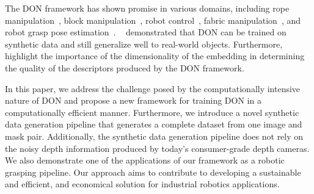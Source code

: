 The DON framework has shown promise in various domains, including rope manipulation~\cite{rope-manipulation},
block manipulation~\cite{block-manipulation}, robot control~\cite{florence2019self}, fabric manipulation~\cite{fabric-manipulation},
and robot grasp pose estimation~\parencites{kupcsik2021supervised}{adrian2022efficient}. \citeauthor{adrian2022efficient}~\cite{adrian2022efficient}
demonstrated that DON can be trained on
synthetic data and still generalize well to real-world objects. Furthermore, \citeauthor{adrian2022efficient}~\cite{adrian2022efficient} highlight the importance of the
dimensionality of the embedding in determining the quality of the descriptors produced by the DON framework.


In this paper, we address the challenge posed by the computationally intensive nature of DON and propose a new framework for training DON
in a computationally efficient manner. Furthermore, we introduce a novel synthetic data generation pipeline that generates a complete dataset
from one image and mask pair. Additionally, the synthetic data generation pipeline does not rely on the noisy depth information produced by
today's consumer-grade depth cameras. We also demonstrate one of the applications of our framework as a robotic grasping pipeline.
Our approach aims to contribute to developing a sustainable and efficient, and economical solution for industrial robotics applications.